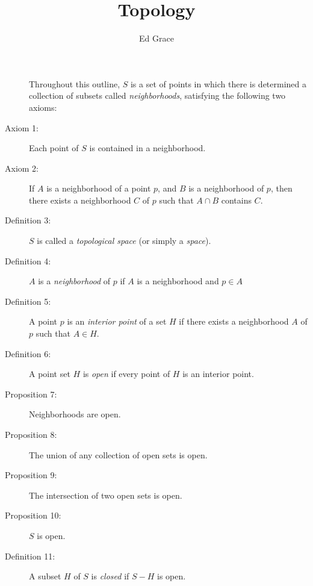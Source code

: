 \documentclass{article}
\let\titlepageAuthor\author
\renewcommand{\author}[1]{\newcommand{\headerAuthor}{#1}\titlepageAuthor{#1}}
\let\titlepageTitle\title
\renewcommand{\title}[1]{\newcommand{\headerTitle}{#1}\titlepageTitle{#1}}
\begin{document}
\title{Topology}
\author{Ed Grace}
\date{ }
\maketitle
\thispagestyle{empty}



\newpage


\begin{description}

  \item[] Throughout this outline, $S$ is a set of points in which there is determined a collection of subsets called \emph{neighborhoods}, satisfying the following two axioms:

  \item[Axiom 1:] Each point of $S$ is contained in a neighborhood.

  \item[Axiom 2:] If $A$ is a neighborhood of a point $p$, and $B$ is a neighborhood of $p$, then there exists a neighborhood $C$ of $p$ such that $A \cap B$ contains $C$.

  \item[Definition 3:] $S$ is called a \emph{topological space} (or simply a \emph{space}).

  \item[Definition 4:] $A$ is a \emph{neighborhood} of $p$ if $A$ is a neighborhood and $p \in A$

  \item[Definition 5:] A point $p$ is an \emph{interior point} of a set $H$ if there exists a neighborhood $A$ of $p$ such that $A \in H$.

  \item[Definition 6:] A point set $H$ is \emph{open} if every point of $H$ is an interior point.

  \item[Proposition 7:] Neighborhoods are open.

  \item[Proposition 8:] The union of any collection of open sets is open.

  \item[Proposition 9:] The intersection of two open sets is open.

  \item[Proposition 10:] $S$ is open.

  \item[Definition 11:] A subset $H$ of $S$ is \emph{closed} if $S-H$ is open.


\end{description}
\end{document}
